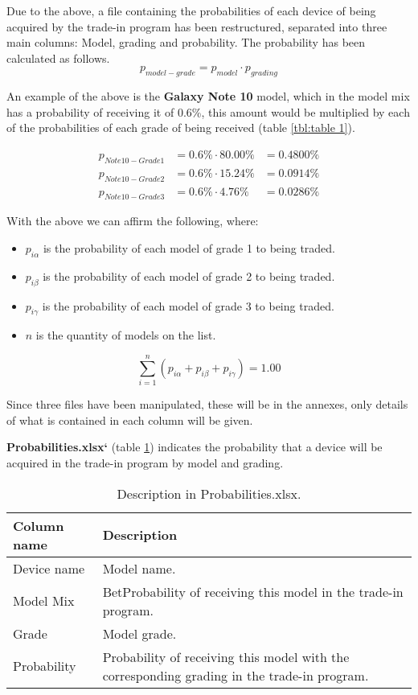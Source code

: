 \documentclass[11pt,a4paper,twocolumn]{article}
\begin{document}
Due to the above, a file containing the probabilities of each device of being acquired by the trade-in program has been restructured, separated into three main columns: Model, grading and probability. The probability has been calculated as follows.
$$
p_{model - grade}=p_{model}\cdot p_{grading}
$$

An example of the above is the {\bf Galaxy Note 10} model, which in the model mix has a probability of receiving it of 0.6\%, this amount would be multiplied by each of the probabilities of each grade of being received (table \ref{tbl:table 1}).

\begin{align*}
p_{Note10-Grade1}&=0.6\% \cdot 80.00\% &= 0.4800\% \\
p_{Note10-Grade2}&=0.6\% \cdot 15.24\% &= 0.0914\% \\
p_{Note10-Grade3}&=0.6\% \cdot 4.76\% &= 0.0286\%
\end{align*}

With the above we can affirm the following, where:
\begin{itemize}
    \item $p_{i \alpha}$ is the probability of each model of grade 1 to being traded.
    \item $p_{i \beta}$ is the probability of each model of grade 2 to being traded.
    \item $p_{i\gamma}$ is the probability of each model of grade 3 to being traded.
    \item $n$ is the quantity of models on the list.
\end{itemize}

$$
\sum_{i=1}^{n} ( p_{i \alpha} + p_{i \beta} + p_{i \gamma} ) = 1.00
$$

Since three files have been manipulated, these will be in the annexes, only details of what is contained in each column will be given.

{\bf Probabilities.xlsx`} (table \ref{tbl:table 2}) indicates the probability that a device will be acquired in the trade-in program by model and grading.

\begin{table}
\centering
\caption{Description in Probabilities.xlsx.}
\label{tbl:table 2}
\begin{tabular}{ll}
\toprule
{\bf Column name} & {\bf Description} \\
\midrule
Device name & \parbox{5cm}{Model name.}\\
\midrule
Model Mix & \parbox{5cm}{BetProbability of receiving this model in the trade-in program.}\\
\midrule
Grade & \parbox{5cm}{Model grade.}\\
\midrule
Probability & \parbox{5cm}{Probability of receiving this model with the corresponding grading in the trade-in program.}\\
\bottomrule
\end{tabular}
\end{table}
\end{document}
